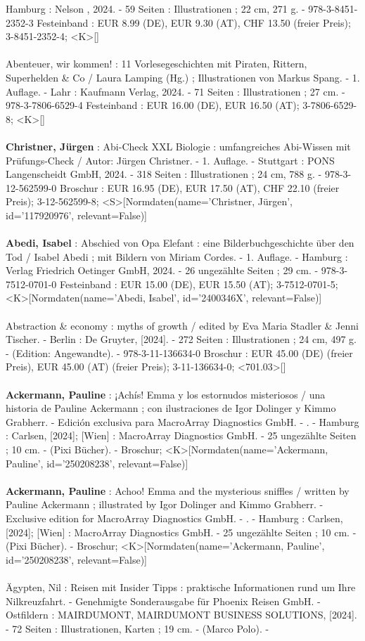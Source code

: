\documentclass{article}
\begin{document}
\begin{multicols}{3}
Hamburg : Nelson  , 2024. - 59 Seiten : Illustrationen ; 22 cm, 271 g. - 978-3-8451-2352-3 Festeinband : EUR 8.99 (DE), EUR 9.30 (AT), CHF 13.50 (freier Preis); 3-8451-2352-4; <K>[]\\\\Abenteuer, wir kommen! : 11 Vorlesegeschichten mit Piraten, Rittern, Superhelden \& Co / Laura Lamping (Hg.) ; Illustrationen von Markus Spang. - 1. Auflage. - Lahr : Kaufmann Verlag, 2024. - 71 Seiten : Illustrationen ; 27 cm. - 978-3-7806-6529-4 Festeinband : EUR 16.00 (DE), EUR 16.50 (AT); 3-7806-6529-8; <K>[]\\\\\textbf{Christner, Jürgen} : Abi-Check XXL Biologie : umfangreiches Abi-Wissen mit Prüfungs-Check / Autor: Jürgen Christner. - 1. Auflage. - Stuttgart : PONS Langenscheidt GmbH, 2024. - 318 Seiten : Illustrationen ; 24 cm, 788 g. - 978-3-12-562599-0 Broschur : EUR 16.95 (DE), EUR 17.50 (AT), CHF 22.10 (freier Preis); 3-12-562599-8; <S>[Normdaten(name='Christner, Jürgen', id='117920976', relevant=False)]\\\\\textbf{Abedi, Isabel} : Abschied von Opa Elefant : eine Bilderbuchgeschichte über den Tod / Isabel Abedi ; mit Bildern von Miriam Cordes. - 1. Auflage. - Hamburg : Verlag Friedrich Oetinger GmbH, 2024. - 26 ungezählte Seiten ; 29 cm. - 978-3-7512-0701-0 Festeinband : EUR 15.00 (DE), EUR 15.50 (AT); 3-7512-0701-5; <K>[Normdaten(name='Abedi, Isabel', id='2400346X', relevant=False)]\\\\Abstraction \& economy : myths of growth / edited by Eva Maria Stadler \& Jenni Tischer. - Berlin : De Gruyter, [2024]. - 272 Seiten : Illustrationen ; 24 cm, 497 g. - (Edition: Angewandte). - 978-3-11-136634-0 Broschur : EUR 45.00 (DE) (freier Preis), EUR 45.00 (AT) (freier Preis); 3-11-136634-0; <701.03>[]\\\\\textbf{Ackermann, Pauline} : ¡Achís! Emma y los estornudos misteriosos / una historia de Pauline Ackermann ; con ilustraciones de Igor Dolinger y Kimmo Grabherr. - Edición exclusiva para MacroArray Diagnostics GmbH. - . - Hamburg : Carlsen, [2024]; [Wien] : MacroArray Diagnostics GmbH. - 25 ungezählte Seiten ; 10 cm. - (Pixi Bücher). - Broschur; <K>[Normdaten(name='Ackermann, Pauline', id='250208238', relevant=False)]\\\\\textbf{Ackermann, Pauline} : Achoo! Emma and the mysterious sniffles / written by Pauline Ackermann ; illustrated by Igor Dolinger and Kimmo Grabherr. - Exclusive edition for MacroArray Diagnostics GmbH. - . - Hamburg : Carlsen, [2024]; [Wien] : MacroArray Diagnostics GmbH. - 25 ungezählte Seiten ; 10 cm. - (Pixi Bücher). - Broschur; <K>[Normdaten(name='Ackermann, Pauline', id='250208238', relevant=False)]\\\\Ägypten, Nil : Reisen mit Insider Tipps : praktische Informationen rund um Ihre Nilkreuzfahrt. - Genehmigte Sonderausgabe für Phoenix Reisen GmbH. - Ostfildern : MAIRDUMONT, MAIRDUMONT BUSINESS SOLUTIONS, [2024]. - 72 Seiten : Illustrationen, Karten ; 19 cm. - (Marco Polo). - 
\end{multicols}
\end{document}
